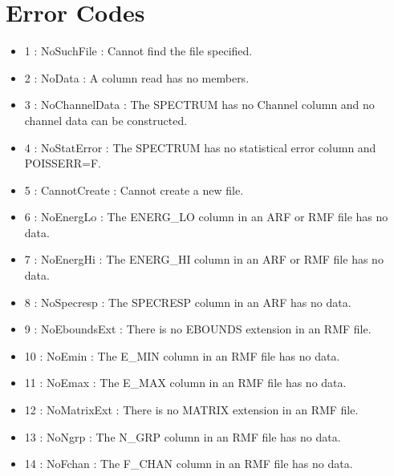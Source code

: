 \documentclass[11pt]{book}
\begin{document}

\chapter{Error Codes}

\begin{itemize}

\item 1 : NoSuchFile : Cannot find the file specified.

\item 2 : NoData : A column read has no members.

\item 3 : NoChannelData : The SPECTRUM has no Channel column and no
channel data can be constructed.

\item 4 : NoStatError : The SPECTRUM has no statistical error column and POISSERR=F.

\item 5 : CannotCreate : Cannot create a new file.

\item 6 : NoEnergLo : The ENERG\_LO column in an ARF or RMF file has no data.

\item 7 : NoEnergHi : The ENERG\_HI column in an ARF or RMF file has no data.

\item 8 : NoSpecresp : The SPECRESP column in an ARF has no data.

\item 9 : NoEboundsExt : There is no EBOUNDS extension in an RMF file.

\item 10 : NoEmin : The E\_MIN column in an RMF file has no data.

\item 11 : NoEmax : The E\_MAX column in an RMF file has no data.

\item 12 : NoMatrixExt : There is no MATRIX extension in an RMF file.

\item 13 : NoNgrp : The N\_GRP column in an RMF file has no data.

\item 14 : NoFchan : The F\_CHAN column in an RMF file has no data.


\end{itemize}
\end{document}
